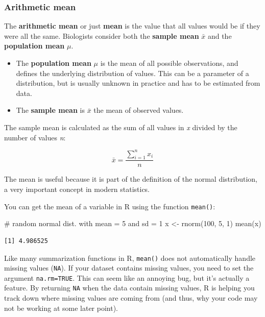 \documentclass[
  13,
  letterpaper,
]{report}
\newenvironment{Shaded}{\begin{snugshade}}{\end{snugshade}}
\newcommand{\CommentTok}[1]{\textcolor[rgb]{0.37,0.37,0.37}{#1}}
\newcommand{\DecValTok}[1]{\textcolor[rgb]{0.68,0.00,0.00}{#1}}
\newcommand{\FunctionTok}[1]{\textcolor[rgb]{0.28,0.35,0.67}{#1}}
\newcommand{\NormalTok}[1]{\textcolor[rgb]{0.00,0.23,0.31}{#1}}
\newcommand{\OtherTok}[1]{\textcolor[rgb]{0.00,0.23,0.31}{#1}}
\begin{document}
\subsubsection{Arithmetic mean}\label{sec-desc-cen-mean-am}

The \textbf{arithmetic mean} or just \textbf{mean} is the value that all
values would be if they were all the same. Biologists consider both the
\textbf{sample mean} \(\bar{x}\) and the \textbf{population mean}
\(\mu\).

\begin{itemize}
\item
  The \textbf{population mean} \(\mu\) is the mean of all possible
  observations, and defines the underlying distribution of values. This
  can be a parameter of a distribution, but is usually unknown in
  practice and has to be estimated from data.
\item
  The \textbf{sample mean} is \(\bar{x}\) the mean of observed values.
\end{itemize}

The sample mean is calculated as the sum of all values in \emph{x}
divided by the number of values \emph{n}:

\[\bar{x}=\frac{\sum_{i=1}^{n}x_i}{n}\]

The mean is useful because it is part of the definition of the normal
distribution, a very important concept in modern statistics.

You can get the mean of a variable in R using the function
\texttt{mean()}:

\begin{Shaded}
\begin{Highlighting}[]
\CommentTok{\# random normal dist. with mean = 5 and sd = 1}
\NormalTok{x }\OtherTok{\textless{}{-}} \FunctionTok{rnorm}\NormalTok{(}\DecValTok{100}\NormalTok{, }\DecValTok{5}\NormalTok{, }\DecValTok{1}\NormalTok{)}
\FunctionTok{mean}\NormalTok{(x)}
\end{Highlighting}
\end{Shaded}

\begin{verbatim}
[1] 4.986525
\end{verbatim}

Like many summarization functions in R, \texttt{mean()} does not
automatically handle missing values (\texttt{NA}). If your dataset
contains missing values, you need to set the argument
\texttt{na.rm=TRUE}. This can seem like an annoying bug, but it's
actually a feature. By returning \texttt{NA} when the data contain
missing values, R is helping you track down where missing values are
coming from (and thus, why your code may not be working at some later
point).
\end{document}

